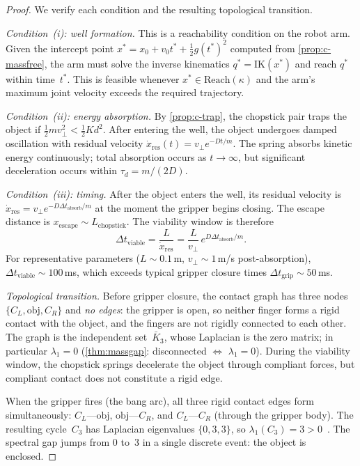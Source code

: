 \begin{proof}
We verify each condition and the resulting topological transition.

\emph{Condition~(i): well formation.}
This is a reachability condition on the robot arm.  Given the
intercept point $x^* = x_0 + v_0 t^* + \frac{1}{2}g (t^*)^2$
computed from \cref{prop:c-massfree}, the arm must solve the
inverse kinematics $q^* = \mathrm{IK}(x^*)$ and reach $q^*$
within time~$t^*$.  This is feasible whenever
$x^* \in \mathrm{Reach}(\kappa)$ and the arm's maximum
joint velocity exceeds the required trajectory.

\emph{Condition~(ii): energy absorption.}
By \cref{prop:c-trap}, the chopstick pair traps the object if
$\frac{1}{2}mv_\perp^2 < \frac{1}{2}Kd^2$.  After entering
the well, the object undergoes damped oscillation with
residual velocity
$\dot{x}_{\mathrm{res}}(t) = v_\perp e^{-Dt/m}$.
The spring absorbs kinetic energy continuously; total absorption
occurs as $t \to \infty$, but significant deceleration occurs
within $\tau_d = m/(2D)$.

\emph{Condition~(iii): timing.}
After the object enters the well, its residual velocity is
$\dot{x}_{\mathrm{res}} = v_\perp e^{-D\Delta t_{\mathrm{absorb}}/m}$
at the moment the gripper begins closing.  The escape distance
is $x_{\mathrm{escape}} \sim L_{\mathrm{chopstick}}$.
The viability window is therefore
\[
  \Delta t_{\mathrm{viable}}
  = \frac{L}{\dot{x}_{\mathrm{res}}}
  = \frac{L}{v_\perp}\, e^{D\Delta t_{\mathrm{absorb}}/m}.
\]
For representative parameters ($L \sim 0.1$\,m,
$v_\perp \sim 1$\,m/s post-absorption),
$\Delta t_{\mathrm{viable}} \sim 100$\,ms, which exceeds
typical gripper closure times
$\Delta t_{\mathrm{grip}} \sim 50$\,ms.

\emph{Topological transition.}
Before gripper closure, the contact graph has three nodes
$\{C_L, \mathrm{obj}, C_R\}$ and \emph{no edges}: the gripper
is open, so neither finger forms a rigid contact with the object,
and the fingers are not rigidly connected to each other.  The
graph is the independent set~$\bar{K}_3$, whose Laplacian is the
zero matrix; in particular $\lambda_1 = 0$
(\cref{thm:massgap}: disconnected $\Leftrightarrow$
$\lambda_1 = 0$).  During the viability window, the chopstick
springs decelerate the object through compliant forces, but
compliant contact does not constitute a rigid edge.

When the gripper fires (the bang arc), all three rigid contact
edges form simultaneously:
$C_L\text{---}\mathrm{obj}$,
$\mathrm{obj}\text{---}C_R$, and
$C_L\text{---}C_R$ (through the gripper body).
The resulting cycle~$C_3$ has Laplacian eigenvalues
$\{0, 3, 3\}$, so $\lambda_1(C_3) = 3 > 0$~\cite{cheeger}.
The spectral gap jumps from $0$ to~$3$ in a single discrete
event: the object is enclosed.
\end{proof}

